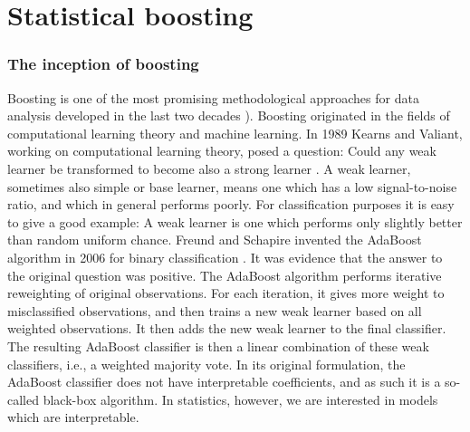 \chapter{Statistical boosting}
\subsection{The inception of boosting}
Boosting is one of the most promising methodological approaches for data analysis developed in the last two decades \citep{mayr14a}). Boosting originated in the fields of computational learning theory and machine learning. In 1989 Kearns and Valiant, working on computational learning theory, posed a question: Could any weak learner be transformed to become also a strong learner \citep{kearnsvaliant}. A weak learner, sometimes also simple or base learner, means one which has a low signal-to-noise ratio, and which in general performs poorly. For classification purposes it is easy to give a good example: A weak learner is one which performs only slightly better than random uniform chance. Freund and Schapire invented the AdaBoost algorithm in 2006 for binary classification \citep{adaboost}. It was evidence that the answer to the original question was positive. The AdaBoost algorithm performs iterative reweighting of original observations. For each iteration, it gives more weight to misclassified observations, and then trains a new weak learner based on all weighted observations. It then adds the new weak learner to the final classifier. The resulting AdaBoost classifier is then a linear combination of these weak classifiers, i.e., a weighted majority vote. In its original formulation, the AdaBoost classifier does not have interpretable coefficients, and as such it is a so-called black-box algorithm. In statistics, however, we are interested in models which are interpretable.

